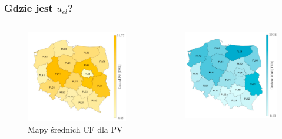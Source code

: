\documentclass{beamer}
\begin{document}
\begin{frame}
	\frametitle{Gdzie jest $u_{el}$?}
	\begin{columns}
		\begin{column}{0.5\textwidth}
			\begin{figure}
				\begin{center}
					\includegraphics[width=\textwidth]{mmc-cf-pv.png}
				\end{center}
				\caption{Mapy średnich CF dla PV}
			\end{figure}
		\end{column}
		\begin{column}{0.5\textwidth}
			\begin{figure}
				\begin{center}
					\includegraphics[width=\textwidth]{mmc-cf-wind.png}

\end{center}
\end{figure}
\end{column}
\end{columns}
\end{frame}
\end{document}
